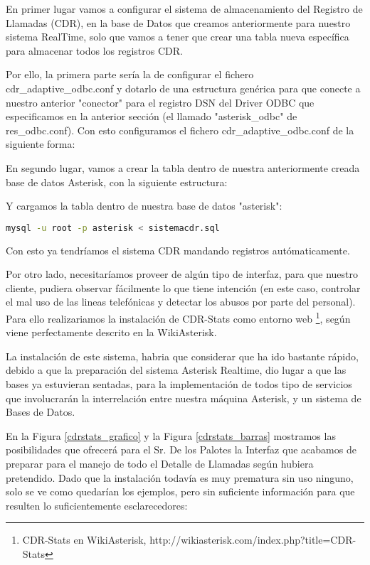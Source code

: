 {En primer lugar vamos a configurar el sistema de almacenamiento del Registro de Llamadas (CDR), en la base de Datos que creamos anteriormente para nuestro sistema RealTime, solo que vamos a tener que crear una tabla nueva específica para almacenar todos los registros CDR.

Por ello, la primera parte sería la de configurar el fichero cdr\_adaptive\_odbc.conf y dotarlo de una estructura genérica para que conecte a nuestro anterior "conector" para el registro DSN del Driver ODBC que especificamos en la anterior sección (el llamado "asterisk\_odbc" de res\_odbc.conf). Con esto configuramos el fichero cdr\_adaptive\_odbc.conf de la siguiente forma:



En segundo lugar, vamos a crear la tabla dentro de nuestra anteriormente creada base de datos Asterisk, con la siguiente estructura:



Y cargamos la tabla dentro de nuestra base de datos "asterisk":

\begin{lstlisting}[language=sh]
mysql -u root -p asterisk < sistemacdr.sql
\end{lstlisting}

Con esto ya tendríamos el sistema CDR mandando registros autómaticamente.

Por otro lado, necesitaríamos proveer de algún tipo de interfaz, para que nuestro cliente, pudiera observar fácilmente lo que tiene intención (en este caso, controlar el mal uso de las lineas telefónicas y detectar los abusos por parte del personal). Para ello realizariamos la instalación de CDR-Stats como entorno web \footnote{CDR-Stats en WikiAsterisk, http://wikiasterisk.com/index.php?title=CDR-Stats}, según viene perfectamente descrito en la WikiAsterisk.

La instalación de este sistema, habria que considerar que ha ido bastante rápido, debido a que la preparación del sistema Asterisk Realtime, dio lugar a que las bases ya estuvieran sentadas, para la implementación de todos tipo de servicios que involucrarán la interrelación entre nuestra máquina Asterisk, y un sistema de Bases de Datos.

En la Figura \ref{cdrstats_grafico} y la Figura \ref{cdrstats_barras} mostramos las posibilidades que ofrecerá para el Sr. De los Palotes la Interfaz que acabamos de preparar para el manejo de todo el Detalle de Llamadas según hubiera pretendido. Dado que la instalación todavía es muy prematura sin uso ninguno, solo se ve como quedarían los ejemplos, pero sin suficiente información para que resulten lo suficientemente esclarecedores:

}
